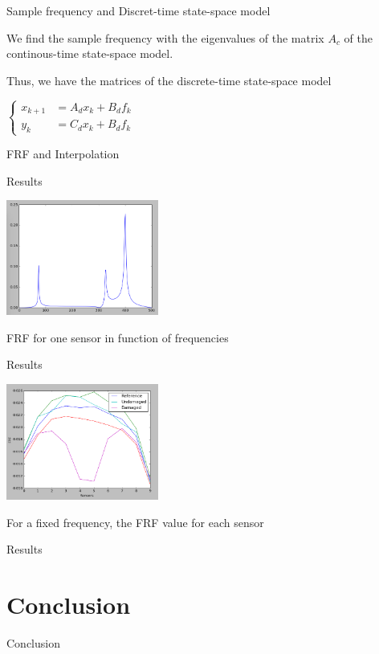 \documentclass{beamer}
\begin{document}
\begin{frame}{Sample frequency and Discret-time state-space model}

We find the sample frequency with the eigenvalues of the matrix $A_c$ of the continous-time state-space model.

\vspace{5mm}

Thus, we have the matrices of the discrete-time state-space model
\begin{center}
$\left\{
\begin{array}{ll}
x_{k+1} & = A_dx_k + B_df_k \\
y_k & = C_dx_k + B_df_k
\end{array}
\right.$
\end{center}

\end{frame}

\begin{frame}{FRF and Interpolation}
\end{frame}

\begin{frame}{Results}
\begin{center}
\includegraphics[width=5cm]{images/FRF_freq.png}

FRF for one sensor in function of frequencies
\end{center}
\end{frame}

\begin{frame}{Results}
\begin{center}
\includegraphics[width=5cm]{images/curve_damage.png}

For a fixed frequency, the FRF value for each sensor
\end{center}

\end{frame}

\begin{frame}{Results}
\end{frame}



\section{Conclusion}

\begin{frame}{Conclusion}
\end{frame}


  
\end{document}
